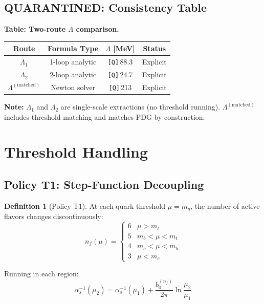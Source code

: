 \documentclass[11pt,a4paper]{article}
\newcommand{\Qnum}[1]{\textcolor{red!70!black}{\texttt{[Q]}}\,#1}
\theoremstyle{definition}
\newtheorem{definition}{Definition}[section]
\begin{document}
\subsection{QUARANTINED: Consistency Table}
\label{subsec:consistency-table}

\begin{quarantinebox}
\textbf{Table: Two-route $\Lambda$ comparison.}
\label{tab:two-route}

\centering
\begin{tabular}{cccc}
\toprule
Route & Formula Type & $\Lambda$ [MeV] & Status \\
\midrule
$\Lambda_1$ & 1-loop analytic & \Qnum{88.3} & Explicit \\
$\Lambda_2$ & 2-loop analytic & \Qnum{24.7} & Explicit \\
$\Lambda^{(\text{matched})}$ & Newton solver & \Qnum{213} & Explicit \\
\bottomrule
\end{tabular}

\textbf{Note:} $\Lambda_1$ and $\Lambda_2$ are single-scale extractions (no threshold running).
$\Lambda^{(\text{matched})}$ includes threshold matching and matches PDG by construction.
\end{quarantinebox}

\section{Threshold Handling}
\label{sec:thresholds}

\subsection{Policy T1: Step-Function Decoupling}
\label{subsec:policy-t1}

\begin{definition}[Policy T1]
\label{def:policy-t1}
At each quark threshold $\mu = m_q$, the number of active flavors changes
discontinuously:
\begin{equation}
\label{eq:t1-nf}
n_f(\mu) = \begin{cases}
6 & \mu > m_t \\
5 & m_b < \mu < m_t \\
4 & m_c < \mu < m_b \\
3 & \mu < m_c
\end{cases}
\end{equation}

Running in each region:
\begin{equation}
\label{eq:t1-running}
\alpha_s^{-1}(\mu_2) = \alpha_s^{-1}(\mu_1) + \frac{b_0^{(n_f)}}{2\pi}\ln\frac{\mu_2}{\mu_1}
\end{equation}
\end{definition}
\end{document}
